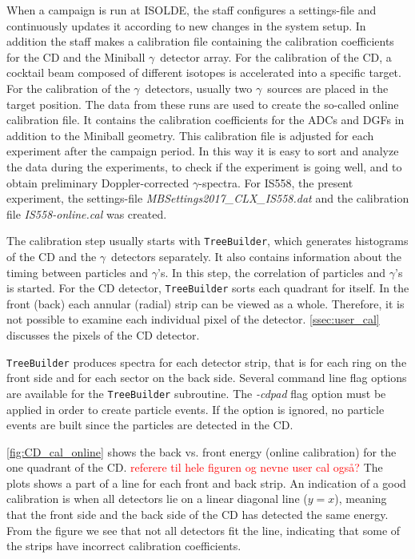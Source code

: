 \documentclass[twoside,english]{uiofysmaster/uiofysmaster}
\newcommand{\ga}{$\gamma$}
\let\orgautoref\autoref
\renewcommand{\autoref}
        {%
		 \def\sectionautorefname{Section}%
		 \def\subsectionautorefname{Section}%
		 \def\subsubsectionautorefname{Section}%
		 \def\chapterautorefname{Chapter}%
          \orgautoref}
\begin{document}
When a campaign is run at ISOLDE, the staff configures a settings-file and continuously updates it according to new changes in the system setup.
In addition the staff makes a calibration file containing the calibration coefficients for the CD and the Miniball \ga\ detector array. 
For the calibration of the CD, a cocktail beam composed of different isotopes is accelerated into a specific target. 
For the calibration of the \ga\ detectors, usually two \ga\ sources are placed in the target position.
The data from these runs are used to create the so-called online calibration file. 
It contains the calibration coefficients for the ADCs and DGFs in addition to the Miniball geometry.
This calibration file is adjusted for each experiment after the campaign period.
In this way it is easy to sort and analyze the data during the experiments, to check if the experiment is going well, and to obtain preliminary Doppler-corrected \ga-spectra.
For IS558, the present experiment, the settings-file \textit{MBSettings2017\_CLX\_IS558.dat} and the calibration file \textit{IS558-online.cal} was created.

The calibration step usually starts with \texttt{TreeBuilder}, which generates histograms of the CD and the \ga\ detectors separately. 
It also contains information about the timing between particles and \ga's. 
In this step, the correlation of particles and \ga's is started.
For the CD detector, \texttt{TreeBuilder} sorts each quadrant for itself.
In the front (back) each annular (radial) strip can be viewed as a whole.
Therefore, it is not possible to examine each individual pixel of the detector. 
\autoref{ssec:user_cal} discusses the pixels of the CD detector.

\texttt{TreeBuilder} produces spectra for each detector strip, that is for each ring on the front side and for each sector on the back side. 
Several command line flag options are available for the \texttt{TreeBuilder} subroutine.
The \textit{-cdpad} flag option must be applied in order to create particle events. 
If the option is ignored, no particle events are built since the particles are detected in the CD.

\autoref{fig:CD_cal_online} shows the back vs. front energy (online calibration) for the one quadrant of the CD. \textcolor{red}{referere til hele figuren og nevne user cal også?}
The plots shows a part of a line for each front and back strip. 
An indication of a good calibration is when all detectors lie on a linear diagonal line ($y = x$), meaning that the front side and the back side of the CD has detected the same energy. 
From the figure we see that not all detectors fit the line, indicating that some of the strips have incorrect calibration coefficients.
\end{document}
